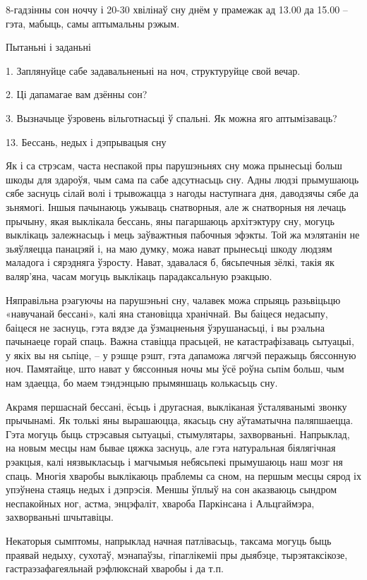 8-гадзінны сон ноччу і 20-30 хвілінаў сну днём у прамежак ад 13.00 да 15.00 – гэта, мабыць, самы аптымальны рэжым.

Пытаньні і заданьні

1. Заплянуйце сабе задавальненьні на ноч, структуруйце свой вечар.

2. Ці дапамагае вам дзённы сон?

3. Вызначыце ўзровень вільготнасьці ў спальні. Як можна яго аптымізаваць?


13. Бессань, недых і дэпрывацыя сну

Як і са стрэсам, часта неспакой пры парушэньнях сну можа прынесьці больш шкоды для здароўя, чым сама па сабе адсутнасьць сну. Адны людзі прымушаюць сябе заснуць сілай волі і трывожацца з нагоды наступнага дня, даводзячы сябе да зьнямогі. Іншыя пачынаюць ужываць снатворныя, але ж снатворныя ня лечаць прычыну, якая выклікала бессань, яны пагаршаюць архітэктуру сну, могуць выклікаць залежнасьць і мець заўважтныя пабочныя эфэкты. Той жа мэлятанін не зьяўляецца панацэяй і, на маю думку, можа нават прынесьці шкоду людзям маладога і сярэдняга ўзросту. Нават, здавалася б, бясьпечныя зёлкі, такія як валяр'яна, часам могуць выклікаць парадаксальную рэакцыю.

Няправільна рэагуючы на парушэньні сну, чалавек можа спрыяць разьвіцьцю «навучанай бессані», калі яна становіцца хранічнай. Вы баіцеся недасыпу, баіцеся не заснуць, гэта вядзе да ўзмацненьня ўзрушанасьці, і вы рэальна пачынаеце горай спаць. Важна ставіцца прасьцей, не катастрафізаваць сытуацыі, у якіх вы ня сьпіце, – у рэшце рэшт, гэта дапаможа лягчэй перажыць бяссонную ноч. Памятайце, што нават у бяссонныя ночы мы ўсё роўна сьпім больш, чым нам здаецца, бо маем тэндэнцыю прымяншаць колькасьць сну.

Акрамя першаснай бессані, ёсьць і другасная, выкліканая ўсталяванымі звонку прычынамі. Як толькі яны вырашаюцца, якасьць сну аўтаматычна паляпшаецца. Гэта могуць быць стрэсавыя сытуацыі, стымулятары, захворваньні. Напрыклад, на новым месцы нам бывае цяжка заснуць, але гэта натуральная біялягічная рэакцыя, калі нязвыкласьць і магчымыя небясьпекі прымушаюць наш мозг ня спаць. Многія хваробы выклікаюць праблемы са сном, на першым месцы сярод іх упэўнена стаяць недых і дэпрэсія. Меншы ўплыў на сон аказваюць сындром неспакойных ног, астма, энцэфаліт, хвароба Паркінсана і Альцгаймэра, захворваньні шчытавіцы. 

Некаторыя сымптомы, напрыклад начная патлівасьць, таксама могуць быць праявай недыху, сухотаў, мэнапаўзы, гіпаглікеміі пры дыябэце, тырэятаксікозе, гастраэзафагеяльнай рэфлюкснай хваробы і да т.п.

